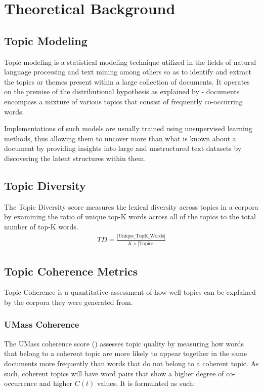 \section{Theoretical Background}
\label{sec:background}
\subsection{Topic Modeling}
Topic modeling is a statistical modeling technique utilized in the fields of natural language processing and text mining among others so as to identify and extract the topics or themes present within a large collection of documents. It operates on the premise of the distributional hypothesis as explained by \cite{Harris:54} - documents encompass a mixture of various topics that consist of frequently co-occurring words. 

Implementations of such models are usually trained using unsupervised learning methods, thus allowing them to uncover more than what is known about a document by providing insights into large and unstructured text datasets by discovering the latent structures within them. 

\subsection{Topic Diversity}
\label{sec:topicDiversity}
The Topic Diversity score measures the lexical diversity across topics in a corpora by examining the ratio of unique top-K words across all of the topics to the total number of top-K words.
\begin{align*}
TD = \frac{|\text{Unique\_TopK\_Words}|}{K \times |\text{Τopics}|}
\end{align*}

\subsection{Topic Coherence Metrics}
\label{sec:topicCoherence}
Topic Coherence is a quantitative assessment of how well topics can be explained by the corpora they were generated from. 
\subsubsection{UMass Coherence}
The UMass coherence score (\cite{Mimno;Wallach;Talley;Leenders;McCallum:11}) assesses topic quality by measuring how words that belong to a coherent topic are more likely to appear together in the same documents more frequently than words that do not belong to a coherent topic. As such, coherent topics will have word pairs that show a higher degree of co-occurrence and higher $C(t)$ values. It is formulated as such:

